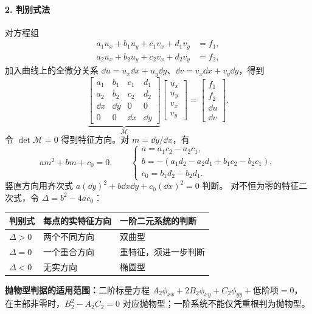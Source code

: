 \paragraph{2. 判别式法}
对方程组
\begin{equation}
 \begin{aligned}
 a_1u_x+b_1u_y+c_1v_x+d_1v_y&=f_1,\\
 a_2u_x+b_2u_y+c_2v_x+d_2v_y&=f_2,
 \end{aligned}
 \label{CFD:LinearEquationGroup}
\end{equation}
加入曲线上的全微分关系 $\dd u=u_x\dd x+u_y\dd y$、$\dd v=v_x\dd x+v_y\dd y$，得到
\[
 \underbrace{\begin{bmatrix}
 a_1&b_1&c_1&d_1\\a_2&b_2&c_2&d_2\\
 \dd x&\dd y&0&0\\0&0&\dd x&\dd y
 \end{bmatrix}}_{\mathcal M}
 \begin{bmatrix}u_x\\u_y\\v_x\\v_y\end{bmatrix}
 =\begin{bmatrix}f_1\\f_2\\\dd u\\\dd v\end{bmatrix}.
\]
令 $\det\mathcal M=0$ 得到特征方向。对 $m=\dd y/\dd x$，有
\[
 am^2+bm+c_0=0,\qquad
 \begin{cases}
 a=a_1c_2-a_2c_1,\\
 b=-(a_1d_2-a_2d_1+b_1c_2-b_2c_1),\\
 c_0=b_1d_2-b_2d_1.
 \end{cases}
\]
竖直方向用齐次式 $a(\dd y)^2+b\dd x\dd y+c_0(\dd x)^2=0$ 判断。
对不恒为零的特征二次式，令 $\Delta=b^2-4ac_0$：
\begin{center}
 \begin{tabular}{lll}
 \toprule
 判别式 & 每点的实特征方向 & 一阶二元系统的判断\\
 \midrule
 $\Delta>0$ & 两个不同方向 & 双曲型\\
 $\Delta=0$ & 一个重合方向 & 重特征，须进一步判断\\
 $\Delta<0$ & 无实方向 & 椭圆型\\
 \bottomrule
 \end{tabular}
\end{center}
\textbf{抛物型判据的适用范围：}二阶标量方程
$A_2\phi_{xx}+2B_2\phi_{xy}+C_2\phi_{yy}+\text{低阶项}=0$，
在主部非零时，$B_2^2-A_2C_2=0$ 对应抛物型；一阶系统不能仅凭重根判为抛物型。


